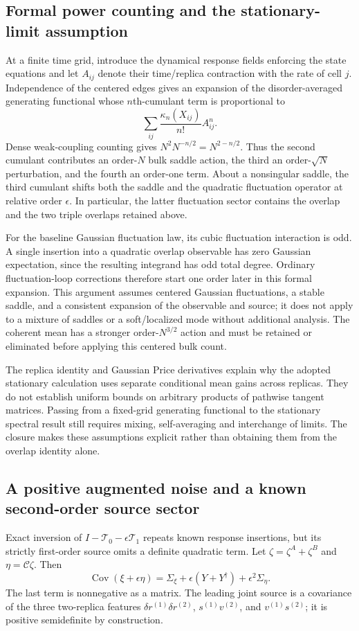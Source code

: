 \subsection{Formal power counting and the stationary-limit assumption}
At a finite time grid, introduce the dynamical response fields enforcing the
state equations and let $A_{ij}$ denote their time/replica contraction with
the rate of cell $j$. Independence of the centered edges gives an expansion
of the disorder-averaged generating functional whose $n$th-cumulant term is
proportional to
\[
 \sum_{ij}\frac{\kappa_n(X_{ij})}{n!}A_{ij}^{n}.
\]
Dense weak-coupling counting gives $N^2N^{-n/2}=N^{2-n/2}$. Thus the second
cumulant contributes an order-$N$ bulk saddle action, the third an
order-$\sqrt N$ perturbation, and the fourth an order-one term. About a
nonsingular saddle, the third cumulant shifts both the saddle and the
quadratic fluctuation operator at relative order $\epsilon$. In particular,
the latter fluctuation sector contains the overlap and the two triple
overlaps retained above.

For the baseline Gaussian fluctuation law, its cubic fluctuation interaction
is odd. A single insertion into a quadratic overlap observable has zero
Gaussian expectation, since the resulting integrand has odd total degree.
Ordinary fluctuation-loop corrections therefore start one order later in
this formal expansion. This argument assumes centered Gaussian fluctuations,
a stable saddle, and a consistent expansion of the observable and source;
it does not apply to a mixture of saddles or a soft/localized mode without
additional analysis. The coherent mean has a stronger order-$N^{3/2}$ action
and must be retained or eliminated before applying this centered bulk count.

The replica identity and Gaussian Price derivatives explain why the adopted
stationary calculation uses separate conditional mean gains across replicas.
They do not establish uniform bounds on arbitrary products of pathwise
tangent matrices. Passing from a fixed-grid generating functional to the
stationary spectral result still requires mixing, self-averaging and
interchange of limits. The closure makes these assumptions explicit rather
than obtaining them from the overlap identity alone.

\subsection{A positive augmented noise and a known second-order source sector}
Exact inversion of $I-\mathcal T_0-\epsilon\mathcal T_1$ repeats known
response insertions, but its strictly first-order source omits a definite
quadratic term. Let $\zeta=\zeta^A+\zeta^B$ and
$\eta=\mathcal C\zeta$. Then
\[
 \operatorname{Cov}(\xi+\epsilon\eta)
 =\Sigma_\xi+\epsilon(Y+Y^\dagger)
                 +\epsilon^2\Sigma_\eta.
\]
The last term is nonnegative as a matrix. The leading joint source is a
covariance of the three two-replica features
$\delta r^{(1)}\delta r^{(2)}$,
$s^{(1)}v^{(2)}$, and $v^{(1)}s^{(2)}$; it is positive semidefinite by
construction.

